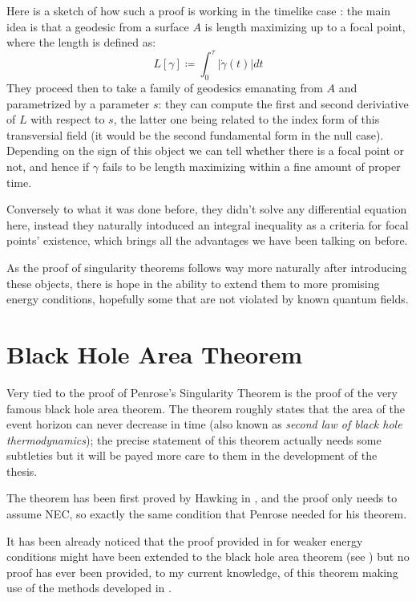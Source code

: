 \documentclass[12pt, a4paper]{article}
\begin{document}
Here is a sketch of how such a proof is working in the timelike case \cite{fewster2020new}: the main idea is that a geodesic from a surface \( A\) is length maximizing up to a focal point, where the length is defined as:
\[
L[\gamma] \coloneqq \int_{0}^{\tau} |\dot{\gamma}(t) |dt
\]
They proceed then to take a family of geodesics emanating from \(A\) and parametrized by a parameter \(s\): they can compute the first and second deriviative of \(L\) with respect to \(s\), the latter one being related to the index form of this transversial field (it would be the second fundamental form in the null case).
Depending on the sign of this object we can tell whether there is a focal point or not, and hence if \(\gamma\) fails to be length maximizing within a fine amount of proper time.

Conversely to what it was done before, they didn't solve any differential equation here, instead they naturally intoduced an integral inequality as a criteria for focal points' existence, which brings all the advantages we have been talking on before.

As the proof of singularity theorems follows way more naturally after introducing these objects, there is hope in the ability to extend them to more promising energy conditions, hopefully some that are not violated by known quantum fields.

\section{Black Hole Area Theorem}
Very tied to the proof of Penrose's Singularity Theorem is the proof of the very famous black hole area theorem.
The theorem roughly states that the area of the event horizon can never decrease in time (also known as \emph{second law of black hole thermodynamics}); the precise statement of this theorem actually needs some subtleties but it will be payed more care to them in the development of the thesis.

The theorem has been first proved by Hawking in \cite{hawking1972black}, and the proof only needs to assume NEC, so exactly the same condition that Penrose needed for his theorem.

It has been already noticed that the proof provided in \cite{fewster2011singularity}
for weaker energy conditions might have been extended to the black hole area theorem (see \cite{lesourd2018remark}) but no proof has ever been provided, to my current knowledge, of this theorem making use of the methods developed in \cite{fewster2020new}.
\end{document}
